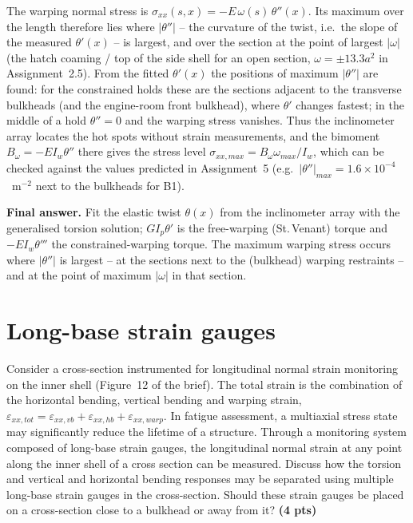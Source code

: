 The warping normal stress is $\sigma_{xx}(s,x)=-E\,\omega(s)\,\theta''(x)$. Its maximum over the length therefore lies where $|\theta''|$ -- the curvature of the twist, i.e.\ the slope of the measured $\theta'(x)$ -- is largest, and over the section at the point of largest $|\omega|$ (the hatch coaming / top of the side shell for an open section, $\omega=\pm13.3a^2$ in Assignment~2.5). From the fitted $\theta'(x)$ the positions of maximum $|\theta''|$ are found: for the constrained holds these are the sections adjacent to the transverse bulkheads (and the engine-room front bulkhead), where $\theta'$ changes fastest; in the middle of a hold $\theta''=0$ and the warping stress vanishes. Thus the inclinometer array locates the hot spots without strain measurements, and the bimoment $B_\omega=-EI_w\theta''$ there gives the stress level $\sigma_{xx,max}=B_\omega\omega_{max}/I_w$, which can be checked against the values predicted in Assignment~5 (e.g.\ $|\theta''|_{max}=1.6\times10^{-4}$~m$^{-2}$ next to the bulkheads for B1).

\bigskip
\noindent\textbf{Final answer.} Fit the elastic twist $\theta(x)$ from the inclinometer array with the generalised torsion solution; $GI_p\theta'$ is the free-warping (St.\,Venant) torque and $-EI_w\theta'''$ the constrained-warping torque. The maximum warping stress occurs where $|\theta''|$ is largest -- at the sections next to the (bulkhead) warping restraints -- and at the point of maximum $|\omega|$ in that section.

\section{Long-base strain gauges}

Consider a cross-section instrumented for longitudinal normal strain monitoring on the inner shell (Figure~12 of the brief). The total strain is the combination of the horizontal bending, vertical bending and warping strain, $\varepsilon_{xx,tot}=\varepsilon_{xx,vb}+\varepsilon_{xx,hb}+\varepsilon_{xx,warp}$. In fatigue assessment, a multiaxial stress state may significantly reduce the lifetime of a structure. Through a monitoring system composed of long-base strain gauges, the longitudinal normal strain at any point along the inner shell of a cross section can be measured. Discuss how the torsion and vertical and horizontal bending responses may be separated using multiple long-base strain gauges in the cross-section. Should these strain gauges be placed on a cross-section close to a bulkhead or away from it? \textbf{(4 pts)}

